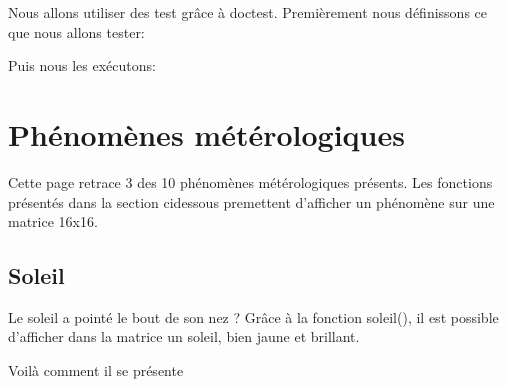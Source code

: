 \documentclass[letterpaper,10pt,english]{sphinxmanual}
\begin{document}
\sphinxAtStartPar
{}

\sphinxAtStartPar
Nous allons utiliser des test grâce à doctest.
Premièrement nous définissons ce que nous allons tester:

\begin{sphinxVerbatim}[commandchars=\\\{\}]
\end{sphinxVerbatim}

\sphinxAtStartPar
Puis nous les exécutons:

\begin{sphinxVerbatim}[commandchars=\\\{\}]
\end{sphinxVerbatim}

\sphinxstepscope


\section{Phénomènes métérologiques}
\label{\detokenize{phenomene:phenomenes-meterologiques}}\label{\detokenize{phenomene::doc}}
\sphinxAtStartPar
Cette page retrace 3 des 10 phénomènes métérologiques présents. Les fonctions présentés dans la section ci\sphinxhyphen{}dessous premettent
d’afficher un phénomène sur une matrice 16x16.


\subsection{Soleil}
\label{\detokenize{phenomene:soleil}}
\sphinxAtStartPar
Le soleil a pointé le bout de son nez ? Grâce à la fonction soleil(), il est possible d’afficher dans la matrice
un soleil, bien jaune et brillant.

\sphinxAtStartPar
Voilà comment il se présente
\end{document}
